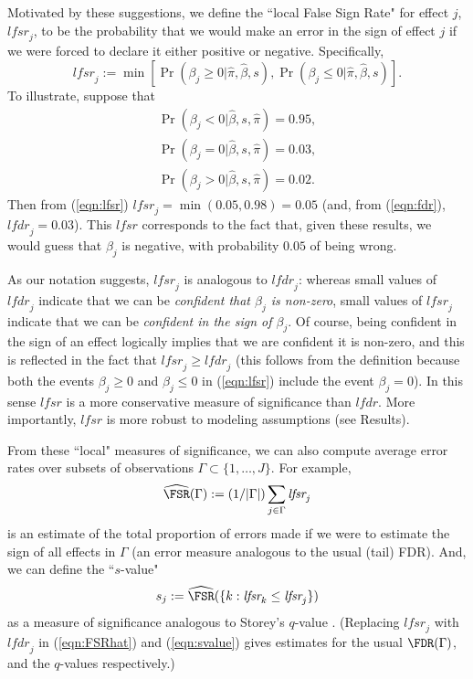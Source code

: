\documentclass[11pt]{article}
\def\lfdr{\textit{lfdr}}
\def\lfsr{\textit{lfsr}}
\def\bhat{\hat{\beta}}
\begin{document}
Motivated by these suggestions, we define the ``local False Sign Rate" for effect $j$, $\lfsr_j$, to be the probability that we
would make an error in the sign of effect $j$ if we were forced to declare it either positive or negative. Specifically,
\begin{equation} \label{eqn:lfsr}
\lfsr_j := \min[ \Pr(\beta_j \geq 0| \hat\pi, \bhat, s), \Pr(\beta_j \leq 0| \hat\pi, \bhat, s) ].
\end{equation}
To illustrate, suppose that 
\begin{gather*}
\Pr(\beta_j < 0| \bhat, s, \hat\pi)=0.95, \\
\Pr(\beta_j =0| \bhat, s, \hat\pi) = 0.03, \\
\Pr(\beta_j >0| \bhat, s, \hat\pi) = 0.02.
\end{gather*} 
Then 
from (\ref{eqn:lfsr}) $\lfsr_j=\min(0.05,0.98)=0.05$ (and, from (\ref{eqn:fdr}), $\lfdr_j=0.03$). This $\lfsr$ corresponds to the fact that, given these results, 
we would guess that $\beta_j$ is negative, with probability $0.05$ of being wrong. 

As our notation suggests, $\lfsr_j$ is analogous to $\lfdr_j$: whereas small values of $\lfdr_j$ indicate that we can be {\it confident that $\beta_j$ is non-zero}, 
small values of $\lfsr_j$ indicate that we can be {\it confident in the sign of $\beta_j$}. 
Of course, being confident in the sign of an effect logically implies that we are confident it is non-zero, and
this is reflected in the fact that $\lfsr_j \geq \lfdr_j$ 
(this follows from the definition because both the events $\beta_j \geq 0$
and $\beta_j \leq 0$ in (\ref{eqn:lfsr}) include the event $\beta_j=0$).
In this sense $\lfsr$ is a more conservative measure of significance than $\lfdr$. 
More importantly, $\lfsr$ is more robust to modeling assumptions (see Results).

From these ``local" measures of significance, we can also compute average error rates over subsets of observations
$\Gamma \subset \{1,\dots,J\}$. For example, 
\begin{equation} \label{eqn:FSRhat}
\widehat\FSR(\Gamma):= (1/|\Gamma|) \sum_{j \in \Gamma} \lfsr_j 
\end{equation}
is an estimate of the total proportion of errors made if we were to estimate the sign of all effects in $\Gamma$
(an error measure analogous to the usual (tail) FDR).
And, we can define the ``$s$-value" 
\begin{equation} \label{eqn:svalue}
s_j := \widehat \FSR(\{k: \lfsr_k \leq \lfsr_j\}) 
\end{equation}
as a measure of significance analogous to Storey's $q$-value \cite{storey.03}.
(Replacing $\lfsr_j$ with $\lfdr_j$ in (\ref{eqn:FSRhat}) and (\ref{eqn:svalue}) gives estimates for the usual $\FDR(\Gamma)$, and the $q$-values respectively.)
\end{document}
